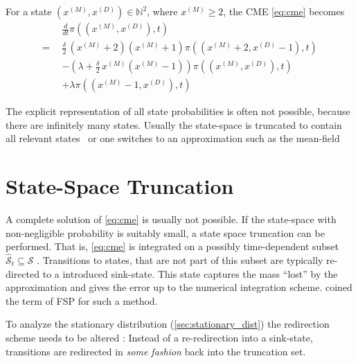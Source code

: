 \begin{example}
\begin{figure}[h!]
  \end{figure}

  For a state $(x^{(M)}, x^{(D)})\in\mathbb{N}^2$, where $x^{(M)}\geq 2$,
  the \ac{CME} \eqref{eq:cme} becomes
  \begin{align*}
    & \frac{d}{dt}\pi((x^{(M)}, x^{(D)}), t)\\
    = \;\,&  \frac{\delta}{2} \, (x^{(M)}+2) (x^{(M)} + 1)
    \pi((x^{(M)}+2, x^{(D)}-1), t)\\
    & - (\lambda + \frac{\delta}{2} \, x^{(M)} (x^{(M)} -
    1))\pi((x^{(M)}, x^{(D)}), t)\\
    & + \lambda \pi((x^{(M)}-1, x^{(D)}), t)
  \end{align*}
\end{example}

The explicit representation of all state probabilities is often not
possible, because
there are infinitely many states. Usually the state-space is
truncated to contain all
relevant states~\parencite{andreychenko2011parameter} or one switches to
an approximation such as the mean-field~\parencite{bortolussi2013continuous}

\section{State-Space Truncation}\label{sec:fsp}
A complete solution of \eqref{eq:cme} is usually not possible.
If the state-space with non-negligible probability is suitably small,
a state space
truncation can be performed.
That is, \eqref{eq:cme} is integrated on a possibly time-dependent subset
$\hat{\mathcal{S}}_t\subseteq\mathcal{S}$
\parencite{henzinger2009sliding,munsky2006finite,spieler2014numerical}.
Transitions to states, that are not part of this subset are typically
re-directed to a introduced sink-state.
This state captures the mass ``lost'' by the approximation and gives
the error up to the numerical integration
scheme.
\citet{munsky2006finite} coined the term of \acf{FSP} for such a method.

To analyze the stationary distribution
(\autoref{sec:stationary_dist}) the redirection scheme needs to be
altered \parencite{kuntz2021stationary}:
Instead of a re-redirection into a sink-state, transitions are
redirected in \emph{some fashion} back into the truncation set.

